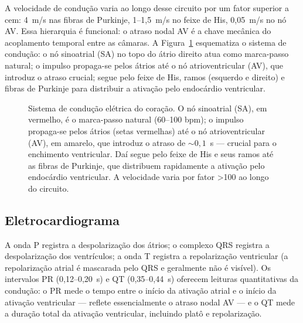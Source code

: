 A velocidade de condução varia ao longo desse circuito por um fator
superior a cem: 4~m/s nas fibras de Purkinje, 1--1,5~m/s no feixe de His,
0,05~m/s no nó AV. Essa hierarquia é funcional: o atraso nodal AV é a
chave mecânica do acoplamento temporal entre as câmaras. A
Figura~\ref{fig:12-conducao} esquematiza o sistema de condução: o
nó sinoatrial (SA) no topo do átrio direito atua como marca-passo
natural; o impulso propaga-se pelos átrios até o nó atrioventricular
(AV), que introduz o atraso crucial; segue pelo feixe de His,
ramos (esquerdo e direito) e fibras de Purkinje para distribuir a
ativação pelo endocárdio ventricular.

\begin{figure}[htbp]
\centering
{}
\caption{Sistema de condução elétrica do coração. O nó sinoatrial (SA), em vermelho, é o marca-passo natural (60--100 bpm); o impulso propaga-se pelos átrios (setas vermelhas) até o nó atrioventricular (AV), em amarelo, que introduz o atraso de $\sim 0{,}1$~s --- crucial para o enchimento ventricular. Daí segue pelo feixe de His e seus ramos até as fibras de Purkinje, que distribuem rapidamente a ativação pelo endocárdio ventricular. A velocidade varia por fator >100 ao longo do circuito.}
\label{fig:12-conducao}
\end{figure}

\subsection{Eletrocardiograma}
\label{sub:image12-ecg}

\begin{exemploenumv}
A onda P registra a despolarização dos átrios; o complexo QRS registra a
despolarização dos ventrículos; a onda T registra a repolarização
ventricular (a repolarização atrial é mascarada pelo QRS e geralmente
não é visível). Os intervalos PR (0,12--0,20~s) e QT (0,35--0,44~s)
oferecem leituras quantitativas da condução: o PR mede o tempo entre o
início da ativação atrial e o início da ativação ventricular --- reflete
essencialmente o atraso nodal AV --- e o QT mede a duração total da
ativação ventricular, incluindo platô e repolarização.
\end{exemploenumv}

